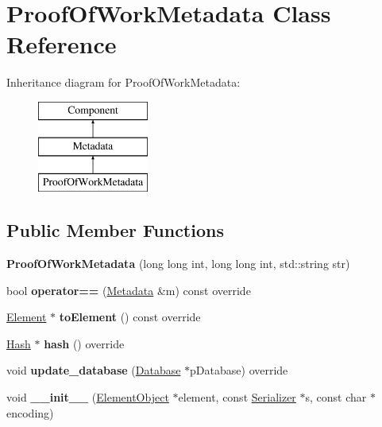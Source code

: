 \hypertarget{classProofOfWorkMetadata}{}\section{Proof\+Of\+Work\+Metadata Class Reference}
\label{classProofOfWorkMetadata}
Inheritance diagram for Proof\+Of\+Work\+Metadata\+:\begin{figure}[H]
\begin{center}
\leavevmode
\includegraphics[height=3.000000cm]{classProofOfWorkMetadata}
\end{center}
\end{figure}
\subsection*{Public Member Functions}
\begin{DoxyCompactItemize}
\item 
\mbox{\label{classProofOfWorkMetadata_a97333caefb5d117d3b894243b29dc4ae}} 
{\bfseries Proof\+Of\+Work\+Metadata} (long long int, long long int, std\+::string str)
\item 
\mbox{\label{classProofOfWorkMetadata_ae490506a28967c7180163fc156dd5d51}} 
bool {\bfseries operator==} (\mbox{\hyperlink{classMetadata}{Metadata}} \&m) const override
\item 
\mbox{\label{classProofOfWorkMetadata_a2aab4c26afb3a85a712cc065028274d9}} 
\mbox{\hyperlink{classElement}{Element}} $\ast$ {\bfseries to\+Element} () const override
\item 
\mbox{\label{classProofOfWorkMetadata_af29f8f40d4b438eaa9434b51c1aff7c6}} 
\mbox{\hyperlink{classHash}{Hash}} $\ast$ {\bfseries hash} () override
\item 
\mbox{\label{classProofOfWorkMetadata_add9667954ffeaee75f3329c6c832e8b7}} 
void {\bfseries update\+\_\+database} (\mbox{\hyperlink{classDatabase}{Database}} $\ast$p\+Database) override
\item 
\mbox{\label{classComponent_a28212595f8ee85fe009bd233bc99b2fc}} 
void {\bfseries \+\_\+\+\_\+init\+\_\+\+\_\+} (\mbox{\hyperlink{classElementObject}{Element\+Object}} $\ast$element, const \mbox{\hyperlink{classSerializer}{Serializer}} $\ast$s, const char $\ast$encoding)
\end{DoxyCompactItemize}
